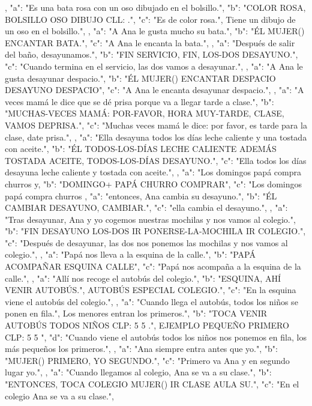 ,
{
"a": "Es una bata rosa con un oso dibujado en el bolsillo.",
"b": "COLOR ROSA, BOLSILLO OSO DIBUJO CLL: .",
"c": "Es de color rosa.", Tiene un dibujo de un oso en el bolsillo.",
}
,
{
"a": "A Ana le gusta mucho su bata.",
"b": "ÉL MUJER() ENCANTAR BATA.",
"c": "A Ana le encanta la bata.",
}
,
{
"a": "Después de salir del baño, desayunamos.",
"b": "FIN SERVICIO, FIN, LOS-DOS DESAYUNO.",
"c": "Cuando termina en el servicio, las dos vamos a desayunar.",
}
,
{
"a": "A Ana le gusta desayunar despacio.",
"b": "ÉL MUJER() ENCANTAR DESPACIO DESAYUNO DESPACIO",
"c": "A Ana le encanta desayunar despacio.",
}
,
{
"a": "A veces mamá le dice que se dé prisa porque va a llegar tarde a clase.",
"b": "MUCHAS-VECES MAMÁ: POR-FAVOR, HORA MUY-TARDE, CLASE, VAMOS DEPRISA.",
"c": "Muchas veces mamá le dice: por favor, es tarde para la clase, date prisa.",
}
,
{
"a": "Ella desayuna todos los días leche caliente y una tostada con aceite.",
"b": "ÉL TODOS-LOS-DÍAS LECHE CALIENTE ADEMÁS TOSTADA ACEITE, TODOS-LOS-DÍAS DESAYUNO.",
"c": "Ella todos los días desayuna leche caliente y tostada con aceite.",
}
,
{
"a": "Los domingos papá compra churros y,
"b": "DOMINGO+ PAPÁ CHURRO COMPRAR",
"c": "Los domingos papá compra churros 
}
,
{
"a": "entonces, Ana cambia su desayuno.",
"b": "ÉL CAMBIAR DESAYUNO, CAMBIAR.",
"c": "ella cambia el desayuno.",
}
,
{
"a": "Tras desayunar, Ana y yo cogemos nuestras mochilas y nos vamos al colegio.",
"b": "FIN DESAYUNO LOS-DOS IR PONERSE-LA-MOCHILA IR COLEGIO.",
"c": "Después de desayunar, las dos nos ponemos las mochilas y nos vamos al colegio.",
}
,
{
"a": "Papá nos lleva a la esquina de la calle.",
"b": "PAPÁ ACOMPAÑAR ESQUINA CALLE",
"c": "Papá nos acompaña a la esquina de la calle.",
}
,
{
"a": "Allí nos recoge el autobús del colegio.",
"b": "ESQUINA, AHÍ VENIR AUTOBÚS.", AUTOBÚS ESPECIAL COLEGIO.",
"c": "En la esquina viene el autobús del colegio.",
}
,
{
"a": "Cuando llega el autobús, todos los niños se ponen en fila.", Los menores entran los primeros.",
"b": "TOCA VENIR AUTOBÚS TODOS NIÑOS CLP: 5 5 .", EJEMPLO PEQUEÑO PRIMERO CLP: 5 5 ",
"d": "Cuando viene el autobús todos los niños nos ponemos en fila, los más pequeños los primeros.",
}
,
{
"a": "Ana siempre entra antes que yo.",
"b": "MUJER() PRIMERO, YO SEGUNDO.",
"c": "Primero va Ana y en segundo lugar yo.",
}
,
{
"a": "Cuando llegamos al colegio, Ana se va a su clase.",
"b": "ENTONCES, TOCA COLEGIO MUJER() IR CLASE AULA SU.",
"c": "En el colegio Ana se va a su clase.",
}
